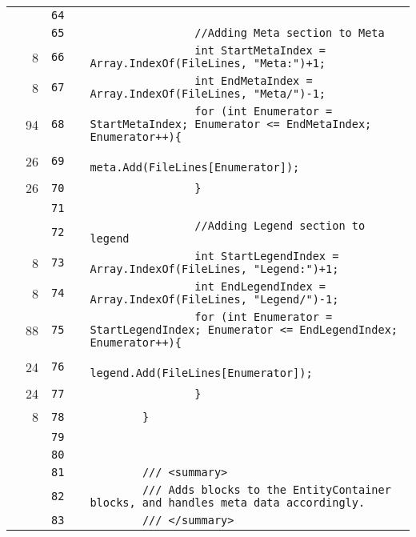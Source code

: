 \documentclass[a4paper,landscape,10pt]{article}
\begin{document}
\begin{longtable}[l]{lrrll}
\cellcolor{gray} &  & \verb~64~ & & \verb~~\\
\cellcolor{gray} &  & \verb~65~ & & \verb~                //Adding Meta section to Meta~\\
\cellcolor{green} & 8 & \verb~66~ & & \verb~                int StartMetaIndex = Array.IndexOf(FileLines, "Meta:")+1;~\\
\cellcolor{green} & 8 & \verb~67~ & & \verb~                int EndMetaIndex = Array.IndexOf(FileLines, "Meta/")-1;~\\
\cellcolor{green} & 94 & \verb~68~ & & \verb~                for (int Enumerator = StartMetaIndex; Enumerator <= EndMetaIndex; Enumerator++){~\\
\cellcolor{green} & 26 & \verb~69~ & & \verb~                        meta.Add(FileLines[Enumerator]);~\\
\cellcolor{green} & 26 & \verb~70~ & & \verb~                }~\\
\cellcolor{gray} &  & \verb~71~ & & \verb~~\\
\cellcolor{gray} &  & \verb~72~ & & \verb~                //Adding Legend section to legend~\\
\cellcolor{green} & 8 & \verb~73~ & & \verb~                int StartLegendIndex = Array.IndexOf(FileLines, "Legend:")+1;~\\
\cellcolor{green} & 8 & \verb~74~ & & \verb~                int EndLegendIndex = Array.IndexOf(FileLines, "Legend/")-1;~\\
\cellcolor{green} & 88 & \verb~75~ & & \verb~                for (int Enumerator = StartLegendIndex; Enumerator <= EndLegendIndex; Enumerator++){~\\
\cellcolor{green} & 24 & \verb~76~ & & \verb~                        legend.Add(FileLines[Enumerator]);~\\
\cellcolor{green} & 24 & \verb~77~ & & \verb~                }~\\
\cellcolor{green} & 8 & \verb~78~ & & \verb~        }~\\
\cellcolor{gray} &  & \verb~79~ & & \verb~~\\
\cellcolor{gray} &  & \verb~80~ & & \verb~~\\
\cellcolor{gray} &  & \verb~81~ & & \verb~        /// <summary>~\\
\cellcolor{gray} &  & \verb~82~ & & \verb~        /// Adds blocks to the EntityContainer blocks, and handles meta data accordingly.~\\
\cellcolor{gray} &  & \verb~83~ & & \verb~        /// </summary>~\\

\end{longtable}
\end{document}
